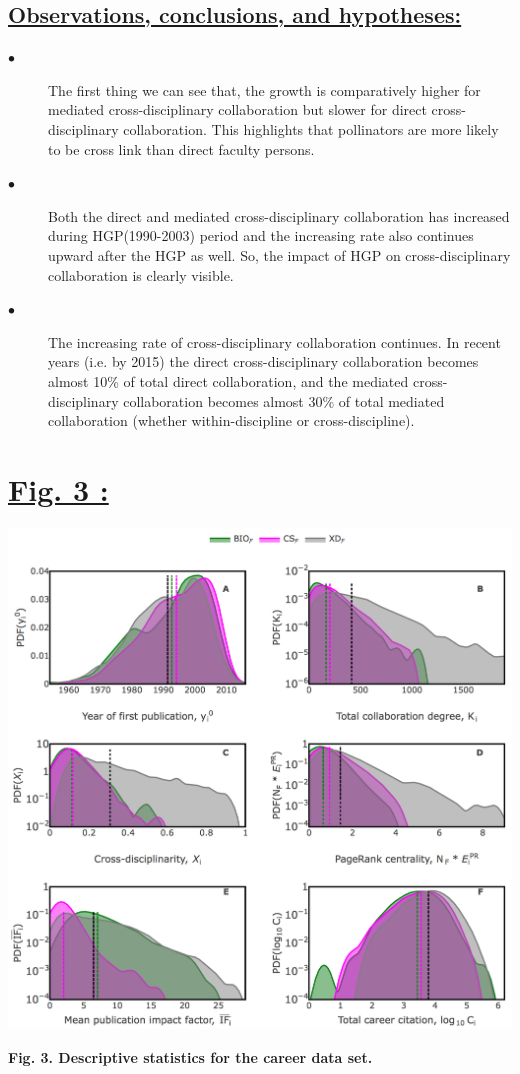 \documentclass{article}\usepackage[]{graphicx}\usepackage[]{color}
\begin{document}
\subsection*{\underline{Observations, conclusions, and hypotheses:}}
\begin{description}
  \item[$\bullet$] The first thing we can see that, the growth is comparatively higher for mediated cross-disciplinary collaboration but slower for direct cross-disciplinary collaboration. This highlights that pollinators are more likely to be cross link than direct faculty persons.
  \item[$\bullet$] Both the direct and mediated cross-disciplinary collaboration has increased during HGP(1990-2003) period and the increasing rate also continues upward after the HGP as well. So, the impact of HGP on cross-disciplinary collaboration is clearly visible.
  \item[$\bullet$] The increasing rate of cross-disciplinary collaboration continues. In recent years (i.e. by 2015) the direct cross-disciplinary collaboration becomes almost 10\% of total direct collaboration, and the mediated cross-disciplinary collaboration becomes almost 30\% of total mediated collaboration (whether within-discipline or cross-discipline).
\end{description}

\newpage
\section*{\underline{Fig. 3 :}}
\begin{center}
\includegraphics[scale=0.6]{3.png}
\newline
\par{\textbf{Fig. 3. Descriptive statistics for the career data set.}}
\end{center}
\end{document}
